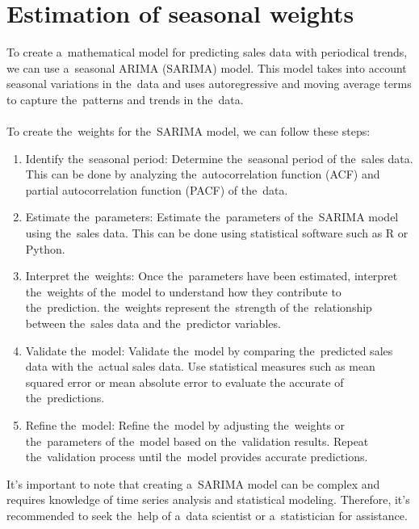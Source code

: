     \section{Estimation of seasonal weights}\label{sec:weights}
    To create a~mathematical model for predicting sales data with periodical trends, we can use a~seasonal
    ARIMA (SARIMA) model. This model takes into account seasonal variations in the~data and uses autoregressive and
    moving average terms to capture the~patterns and trends in the~data.\\
    \\
    To create the~weights for the~SARIMA model, we can follow these steps:
    \begin{enumerate}
        \item Identify the~seasonal period: Determine the~seasonal period of the~sales data. This can be done by
        analyzing the~autocorrelation function (ACF) and partial autocorrelation function (PACF) of the~data.
        \item Estimate the~parameters: Estimate the~parameters of the~SARIMA model using the~sales data.
        This can be done using statistical software such as R or Python.
        \item Interpret the~weights: Once the~parameters have been estimated, interpret the~weights of the~model
        to understand how they contribute to the~prediction. the~weights represent the~strength of the~relationship
        between the~sales data and the~predictor variables.
        \item Validate the~model: Validate the~model by comparing the~predicted sales data with the~actual sales data.
        Use statistical measures such as mean squared error or mean absolute error to evaluate the
        accurate of the~predictions.
        \item Refine the~model: Refine the~model by adjusting the~weights or the~parameters of the~model based on
        the~validation results. Repeat the~validation process until the~model provides accurate predictions.
    \end{enumerate}
    It's important to note that creating a~SARIMA model can be complex and requires knowledge of time series
    analysis and statistical modeling. Therefore, it's recommended to seek the~help of a~data scientist
    or a~statistician for assistance.

